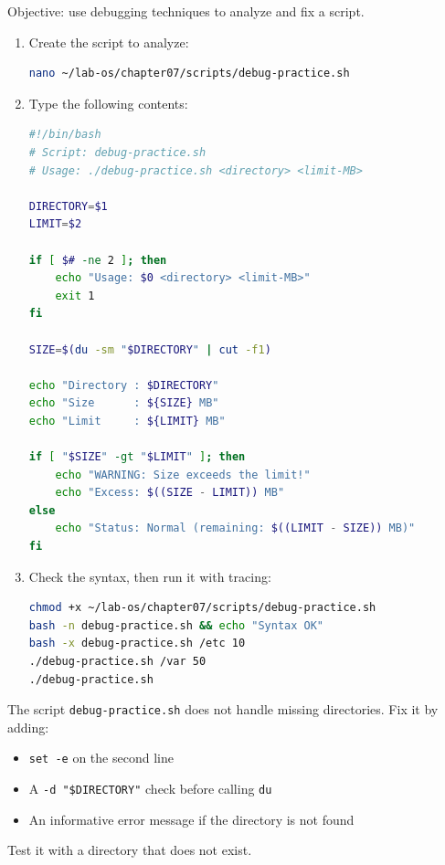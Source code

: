 Objective: use debugging techniques to analyze and fix a script.

\begin{enumerate}
  \item Create the script to analyze:
\begin{lstlisting}[language=bash, caption={Creating debug-practice.sh}]
nano ~/lab-os/chapter07/scripts/debug-practice.sh
\end{lstlisting}

  \item Type the following contents:
\begin{lstlisting}[language=bash, caption={Contents of debug-practice.sh}]
#!/bin/bash
# Script: debug-practice.sh
# Usage: ./debug-practice.sh <directory> <limit-MB>

DIRECTORY=$1
LIMIT=$2

if [ $# -ne 2 ]; then
    echo "Usage: $0 <directory> <limit-MB>"
    exit 1
fi

SIZE=$(du -sm "$DIRECTORY" | cut -f1)

echo "Directory : $DIRECTORY"
echo "Size      : ${SIZE} MB"
echo "Limit     : ${LIMIT} MB"

if [ "$SIZE" -gt "$LIMIT" ]; then
    echo "WARNING: Size exceeds the limit!"
    echo "Excess: $((SIZE - LIMIT)) MB"
else
    echo "Status: Normal (remaining: $((LIMIT - SIZE)) MB)"
fi
\end{lstlisting}

  \item Check the syntax, then run it with tracing:
\begin{lstlisting}[language=bash, caption={Analyzing the script with debugging}]
chmod +x ~/lab-os/chapter07/scripts/debug-practice.sh
bash -n debug-practice.sh && echo "Syntax OK"
bash -x debug-practice.sh /etc 10
./debug-practice.sh /var 50
./debug-practice.sh
\end{lstlisting}
\end{enumerate}

\begin{exercisebox}[Exercise 7.5]
The script \texttt{debug-practice.sh} does not handle missing directories.
Fix it by adding:
\begin{itemize}
  \item \texttt{set -e} on the second line
  \item A \texttt{-d "\$DIRECTORY"} check before calling \texttt{du}
  \item An informative error message if the directory is not found
\end{itemize}
Test it with a directory that does not exist.
\end{exercisebox}

